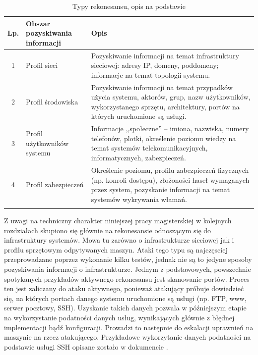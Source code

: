 \begin{longtable}{|c|p{4cm}|p{8cm}|}
	\hline
	\textbf{Lp.} &
	\textbf{Obszar pozyskiwania informacji} &
	\textbf{Opis} \\ \hline\hline
	1 & Profil sieci &
	Pozyskiwanie informacji na temat infrastruktury sieciowej: adresy IP, domeny, poddomeny; informacje na temat topologii
	systemu.\\
	\hline
  	2 & Profil środowiska &
	Pozyskiwanie informacji na temat przypadków użycia systemu, aktorów, grup, nazw użytkowników, wykorzystanego sprzętu, architektury,
	portów na których uruchomione są usługi.
  	\\
	\hline
	3 & Profil użytkowników systemu &
	Informacje ,,społeczne'' -- imiona, nazwiska, numery telefonów, plotki, określenie poziomu wiedzy na temat systemów
	telekomunikacyjnych, informatycznych, zabezpieczeń.
	\\
	\hline
	4 & Profil zabezpieczeń &
	Określenie poziomu, profilu zabezpieczeń fizycznych (np. konroli dostępu), złożoności haseł wymaganych przez system, pozyskanie
	informacji na temat systemów wykrywania włamań.\\
	\hline
	\caption{Typy rekonesansu, opis na podstawie \cite{rekonesans}}
	\label{tab:rekonesans}
\end{longtable}

Z uwagi na techniczny charakter niniejszej pracy magisterskiej w kolejnych rozdziałach skupiono się głównie na rekonesansie odnoszącym
się do infrastruktury systemów. Mowa tu zarówno o infrastrukturze sieciowej jak i profilu sprzętowym odpytywanych maszyn. Ataki tego typu
są najczęsciej przeprowadzane poprzez wykonanie kilku testów, jednak nie są to jedyne sposoby pozyskiwania informacji o infrastrukturze.
Jednym z podstawowych, powszechnie spotykanych przykładów aktywnego rekonesansu jest skanowanie portów. Proces ten jest zaliczany
do ataku aktywnego, ponieważ atakujący próbuje dowiedzieć się, na których portach danego systemu uruchomione są usługi (np. FTP, www,
serwer pocztowy, SSH). Uzyskanie takich danych pozwala w późniejszym etapie na wykorzystanie podatności danych usług, wynikających
głównie z błędnej implementacji bądź konfiguracji. Prowadzi to następnie do eskalacji uprawnień na maszynie na rzecz atakującego.
Przykładowe wykorzytanie danych podatności na podstawie usługi SSH opisane zostało w dokumencie \cite{ssh_podatnosci}.

